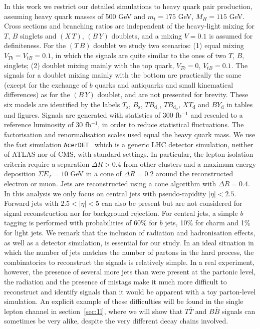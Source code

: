 \documentclass[12pt,a4paper]{article}
\newcommand{\TT}{T \bar T}
\newcommand{\BB}{B \bar B}
\newcommand{\Ts}{T_\text{s}}
\newcommand{\Bs}{B_\text{s}}
\newcommand{\TBd}{TB_{\text{d}_1}}
\newcommand{\TBD}{TB_{\text{d}_2}}
\newcommand{\XTd}{XT_\text{d}}
\newcommand{\BYd}{BY_\text{d}}
\newcommand{\TB}{(T \, B)}
\newcommand{\XT}{(X \, T)}
\newcommand{\BY}{(B \, Y)}
\begin{document}
In this work we restrict our detailed simulations to heavy quark pair production,
assuming heavy quark masses of 500 GeV and $m_t = 175$ GeV, $M_H = 115$ GeV. Cross sections and branching ratios are independent of the heavy-light mixing for $T$, $B$ singlets and
$\XT$, $\BY$ doublets, and a mixing $V = 0.1$ is assumed for definiteness. For the $\TB$ doublet we study two scenarios: (1) equal mixing $V_{Tb} = V_{tB} = 0.1$, in which the signals are quite similar to the ones of two $T$, $B$, singlets; (2) doublet mixing mainly with the top quark, $V_{Tb} = 0$, $V_{tB} = 0.1$. The signals for a doublet mixing mainly with the bottom are practically the same (except for the exchange of $b$ quarks and antiquarks and small kinematical differences) as for the $\BY$ doublet, and are not presented for brevity.
These six models are identified by the labels $\Ts$, $\Bs$, $\TBd$, $\TBD$, $\XTd$ and $\BYd$ in tables and figures.
Signals are generated with statistics of 300 fb$^{-1}$ and rescaled to a reference luminosity of 30 fb$^{-1}$, in order to reduce statistical fluctuations.
The factorisation and renormalisation scales used equal the heavy quark mass.
We use the fast simulation {\tt AcerDET}~\cite{RichterWas:2002ch} which is a generic LHC detector simulation, neither of ATLAS nor of CMS, with standard settings.
In particular, the lepton isolation criteria require a separation $\Delta R > 0.4$ from other clusters and a maximum energy deposition $\Sigma E_T = 10$ GeV in a cone of $\Delta R = 0.2$ around the reconstructed electron or muon. Jets are reconstructed using a cone algorithm with $\Delta R = 0.4$. In this analysis we only focus on central jets with pseudo-rapidity $|\eta| < 2.5$. Forward jets with $2.5 < |\eta| < 5$ can also be present but are not considered for signal reconstruction nor for background rejection.
For central jets, a simple $b$ tagging is performed with probabilities of 60\% for $b$ jets, 10\% for charm and 1\% for light jets. We remark that the inclusion of radiation and hadronisation effects, as well as a detector simulation, is essential for our study. In an ideal situation in which the number of jets matches the number of partons in the hard process, the combinatorics to reconstruct the signals is relatively simple. In a real experiment, however, the presence of several more jets than were present at the partonic level, the radiation and the presence of mistags make it much more difficult to reconstruct and identify signals than it would be apparent with a toy parton-level simulation. An explicit example of these difficulties will be found in the single lepton channel in section~\ref{sec:1l}, where we will show that $\TT$ and $\BB$ signals can sometimes be very alike, despite the very different decay chains involved.
\end{document}
